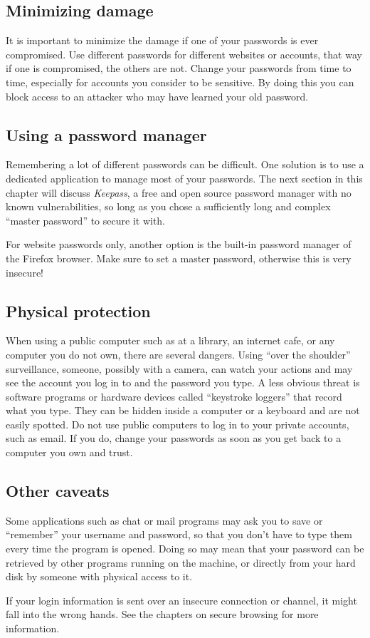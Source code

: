 \subsection{Minimizing damage}

It is important to minimize the damage if one of your passwords is ever
compromised. Use different passwords for different websites or accounts,
that way if one is compromised, the others are not. Change your
passwords from time to time, especially for accounts you consider to be
sensitive. By doing this you can block access to an attacker who may
have learned your old password.

\subsection{Using a password manager}

Remembering a lot of different passwords can be difficult. One solution
is to use a dedicated application to manage most of your passwords. The
next section in this chapter will discuss \emph{Keepass}, a free and
open source password manager with no known vulnerabilities, so long as
you chose a sufficiently long and complex ``master password'' to secure
it with.

For website passwords only, another option is the built-in password
manager of the Firefox browser. Make sure to set a master password,
otherwise this is very insecure!

\subsection{Physical protection}

When using a public computer such as at a library, an internet cafe, or
any computer you do not own, there are several dangers. Using ``over the
shoulder'' surveillance, someone, possibly with a camera, can watch your
actions and may see the account you log in to and the password you type.
A less obvious threat is software programs or hardware devices called
``keystroke loggers'' that record what you type. They can be hidden
inside a computer or a keyboard and are not easily spotted. Do not use
public computers to log in to your private accounts, such as email. If
you do, change your passwords as soon as you get back to a computer you
own and trust.

\subsection{Other caveats}

Some applications such as chat or mail programs may ask you to save or
``remember'' your username and password, so that you don't have to type
them every time the program is opened. Doing so may mean that your
password can be retrieved by other programs running on the machine, or
directly from your hard disk by someone with physical access to it.

If your login information is sent over an insecure connection or
channel, it might fall into the wrong hands. See the chapters on secure
browsing for more information.
